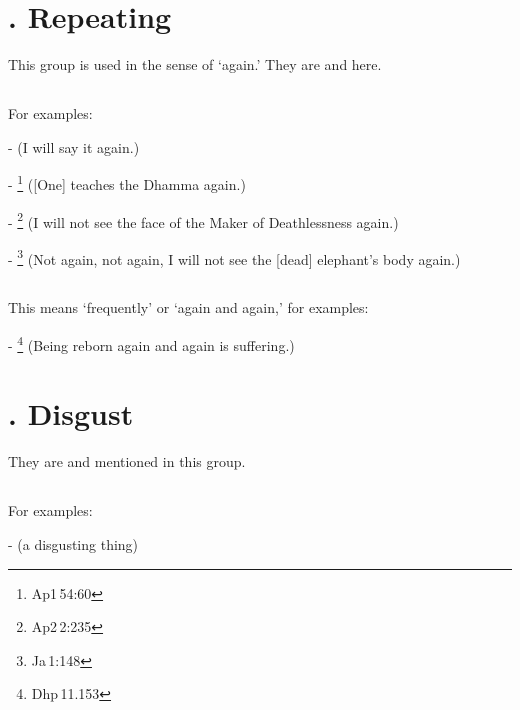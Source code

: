 \label{nipgrp15}
\section*{. Repeating}

This group is used in the sense of `again.' They are  and  here.

\subsection*{}\label{nip:puna}\label{nip:puno}\label{nip:punadm}
For examples:\par
-  (I will say it again.) \par
- \footnote{Ap1\,54:60} ([One] teaches the Dhamma again.) \par
- \footnote{Ap2\,2:235} (I will not see the face of the Maker of Deathlessness again.) \par
- \footnote{Ja\,1:148} (Not again, not again, I will not see the [dead] elephant's body again.) \par

\subsection*{}\label{nip:punuppunadm}
This means `frequently' or `again and again,' for examples:\par
- \footnote{Dhp\,11.153} (Being reborn again and again is suffering.) \par

\label{nipgrp16}
\section*{. Disgust}

They are  and  mentioned in this group.

\subsection*{}\label{nip:dudtdthu}
For examples:\par
-  (a disgusting thing) \par

